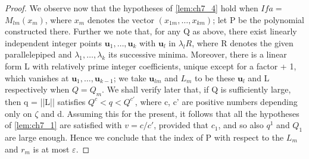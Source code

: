 \begin{proof}
We observe now that the hypotheses of \autoref{lem:ch7_4} hold when $Ifa =$ $M_{lm}(x_m)$, where $x_m$ denotes the vector $(x_{1m},\dots,x_{km})$; let P be the polynomial constructed there. Further we note that, for any Q as above, there exist linearly independent integer points $\mathbf{u}_1, \dots, \mathbf{u}_k$ with $\mathbf{u}_l$ in $\lambda_l R$, where R denotes the given parallelepiped and $\lambda_1, \dots, \lambda_k$ its successive minima. Moreover, there is a linear form L with relatively prime integer coefficients, unique except for a factor + 1, which vanishes at $\mathbf{u}_1, \dots, \mathbf{u}_{k-1}$; we take $\mathbf{u}_{lm}$ and $L_m$ to be these $\mathbf{u}_l$ and L respectively when $Q = Q_m$. We shall verify later that, if Q is sufficiently large, then q = ||L|| satisfies $Q^c < q < Q^{c'}$, where c, c' are positive numbers depending only on $\zeta$ and d. Assuming this for the present, it follows that all the hypotheses of \autoref{lem:ch7_1} are satisfied with $v = c/c'$, provided that $c_1$, and so also $q^1$ and $Q_1$ are large enough. Hence we conclude that the index of P with respect to the $L_m$ and $r_m$ is at most $\varepsilon$.


\end{proof}
